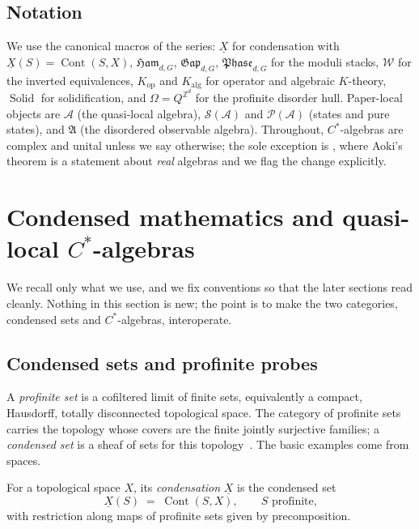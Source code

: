 \documentclass[12pt]{article}
\newcommand{\cond}[1]{\underline{#1}}          %
\newcommand{\Cont}{\operatorname{Cont}}        %
\newcommand{\Ham}{\mathfrak{Ham}}              %
\newcommand{\Gap}{\mathfrak{Gap}}              %
\newcommand{\Phase}{\mathfrak{Phase}}          %
\newcommand{\Weq}{\mathcal{W}}                 %
\newcommand{\Kop}{K_{\mathrm{op}}}             %
\newcommand{\Kalg}{K_{\mathrm{alg}}}           %
\newcommand{\Solid}{\operatorname{Solid}}      %
\newcommand{\dis}{\Omega}                       %
\newcommand{\qla}{\mathcal{A}}                  %
\newcommand{\St}{\mathcal{S}}                   %
\newcommand{\Pu}{\mathcal{P}}                   %
\newcommand{\dalg}{\mathfrak{A}}               %
\newcommand{\ZZ}{\mathbb{Z}}
\theoremstyle{plain}
\begin{document}
\subsection{Notation}

We use the canonical macros of the series: $\cond{X}$ for condensation with
$\cond{X}(S)=\Cont(S,X)$, $\Ham_{d,G}$, $\Gap_{d,G}$, $\Phase_{d,G}$ for the moduli
stacks, $\Weq$ for the inverted equivalences, $\Kop$ and $\Kalg$ for operator and
algebraic $K$-theory, $\Solid$ for solidification, and $\dis=Q^{\ZZ^{d}}$ for the
profinite disorder hull. Paper-local objects are $\qla$ (the quasi-local algebra),
$\St(\qla)$ and $\Pu(\qla)$ (states and pure states), and $\dalg$ (the disordered
observable algebra). Throughout, $C^{*}$-algebras are complex and unital unless we
say otherwise; the sole exception is , where Aoki's theorem is a
statement about \emph{real} algebras and we flag the change explicitly.

\section{Condensed mathematics and quasi-local \texorpdfstring{$C^{*}$}{C*}-algebras}
\label{sec:framework}

We recall only what we use, and we fix conventions so that the later sections read
cleanly. Nothing in this section is new; the point is to make the two categories,
condensed sets and $C^{*}$-algebras, interoperate.

\subsection{Condensed sets and profinite probes}

A \emph{profinite set} is a cofiltered limit of finite sets, equivalently a compact,
Hausdorff, totally disconnected topological space. The category of profinite sets
carries the topology whose covers are the finite jointly surjective families; a
\emph{condensed set} is a sheaf of sets for this topology~\cite{clausen-scholze-condensed,barwick-haine-pyknotic}.
The basic examples come from spaces.

\begin{definition}[Condensation]
\label{def:condensation}
For a topological space $X$, its \emph{condensation} $\cond{X}$ is the condensed set
\[
  \cond{X}(S) \;=\; \Cont(S,X), \qquad S \text{ profinite,}
\]
with restriction along maps of profinite sets given by precomposition.
\end{definition}
\end{document}
